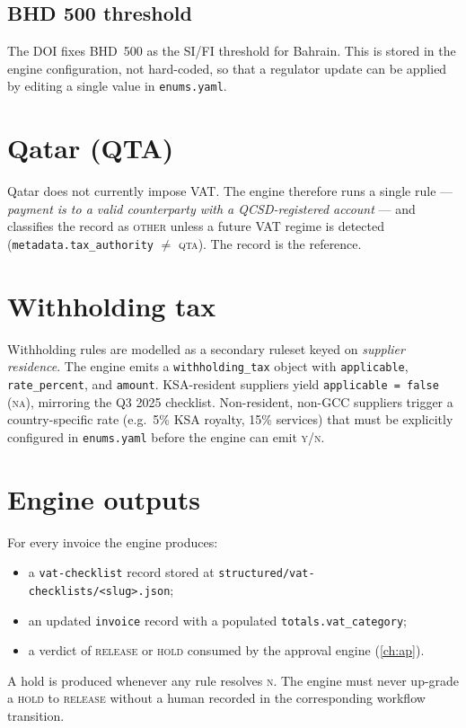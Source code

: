 \subsection{BHD 500 threshold}

The DOI fixes BHD~500 as the SI/FI threshold for Bahrain. This is stored
in the engine configuration, not hard-coded, so that a regulator update
can be applied by editing a single value in \texttt{enums.yaml}.

\section{Qatar (QTA)}

Qatar does not currently impose VAT. The engine therefore runs a single
rule --- \emph{payment is to a valid counterparty with a QCSD-registered
account} --- and classifies the record as \textsc{other} unless a
future VAT regime is detected (\texttt{metadata.tax\_authority}
$\neq$ \textsc{qta}). The
\corpus{}
record is the reference.

\section{Withholding tax}

Withholding rules are modelled as a secondary ruleset keyed on
\emph{supplier residence}. The engine emits a
\texttt{withholding\_tax} object with \texttt{applicable}, \texttt{rate\_percent},
and \texttt{amount}. KSA-resident suppliers yield
\texttt{applicable~=~false} (\textsc{na}), mirroring the Q3 2025
checklist. Non-resident, non-GCC suppliers trigger a country-specific
rate (e.g.\ 5\% KSA royalty, 15\% services) that must be explicitly
configured in \texttt{enums.yaml} before the engine can emit
\textsc{y}/\textsc{n}.

\section{Engine outputs}

For every invoice the engine produces:
\begin{itemize}
  \item a \texttt{vat-checklist} record stored at
        \texttt{structured/vat-checklists/<slug>.json};
  \item an updated \texttt{invoice} record with a populated
        \texttt{totals.vat\_category};
  \item a verdict of \textsc{release} or \textsc{hold} consumed by the
        approval engine (\cref{ch:ap}).
\end{itemize}

A hold is produced whenever any rule resolves \textsc{n}. The engine
must never up-grade a \textsc{hold} to \textsc{release} without a human
recorded in the corresponding workflow transition.
